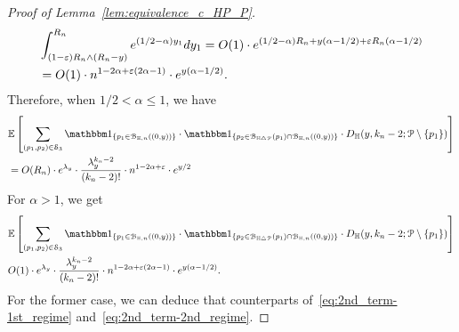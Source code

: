 \begin{proof}[Proof of Lemma~\ref{lem:equivalence_c_HP_P}]
\begin{equation}
\begin{split}
&\int_{(1-\varepsilon) R_n \wedge (R_n-y)}^{R_n} e^{(1/2 - \alpha) y_1} dy_1 
= O(1) \cdot e^{(1/2-\alpha) R_n + y(\alpha -1/2) + \varepsilon R_n (\alpha -1/2)} \\
&= O(1) \cdot n^{1-2\alpha +\varepsilon(2\alpha -1)} \cdot e^{y(\alpha -1/2)}. 
\end{split}
\end{equation}
Therefore, when $1/2 < \alpha \leq 1$, we have 
\begin{equation} \label{eq:case_a<1}
\begin{split} 
&\Exp { \sum_{(p_1,p_2)  \in \mathcal{S}_3} 
\ind{p_1 \in \BallHyp{(0,y)}} \cdot \ind{p_2 \in \BallSym{p_1} \cap \BallHyp{(0,y)}}
\cdot D_\H (y,k_n-2;\Pcal \setminus \{ p_1\})} \\
&=O(R_n) \cdot e^{\lambda_y} \cdot \frac{\lambda_y^{k_n-2}}{(k_n-2)!} \cdot 
n^{1-2\alpha + \eps} \cdot e^{y/2}
\end{split}
\end{equation}
For $\alpha >1$, we get 
\begin{equation} \label{eq:case_a>1}
\begin{split} 
&\Exp { \sum_{(p_1,p_2)  \in \mathcal{S}_3} 
\ind{p_1 \in \BallHyp{(0,y)}} \cdot \ind{p_2 \in \BallSym{p_1} \cap \BallHyp{(0,y)}}
\cdot D_\H (y,k_n-2;\Pcal \setminus \{ p_1\})} \\
& O(1) \cdot e^{\lambda_y} \cdot \frac{\lambda_y^{k_n-2}}{(k_n-2)!} \cdot 
 n^{1-2\alpha +\eps(2\alpha -1)} \cdot e^{y(\alpha -1/2)}.
\end{split}
\end{equation}
For the former case, we can deduce that counterparts of~\eqref{eq:2nd_term-1st_regime} and~\eqref{eq:2nd_term-2nd_regime}. 


\end{proof}
